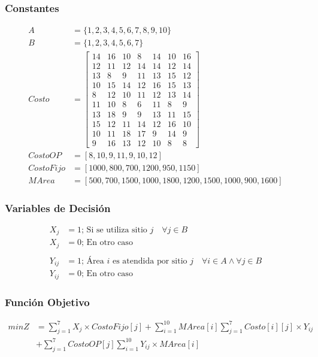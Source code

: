\documentclass[a4paper,12pt]{article}
\begin{document}
\subsubsection{Constantes}
\begin{equation*}
\begin{split}
	A&=\{1,2,3,4,5,6,7,8,9,10\}\\
	B&=\{1,2,3,4,5,6,7\}\\
	Costo &= \begin{bmatrix}
	14 & 16 & 10 & 8 & 14 & 10 & 16\\
	12 & 11 & 12 & 14 & 14 & 12 & 14\\
	13 & 8 & 9 & 11 & 13 & 15 & 12\\
	10 & 15 & 14 & 12 & 16 & 15 & 13\\
	8 & 12 & 10 & 11 & 12 & 13 & 14\\
	11 & 10 & 8 & 6 & 11 & 8 & 9\\
	13 & 18 & 9 & 9 & 13 & 11 & 15\\
	15 & 12 & 11 & 14 & 12 & 16 & 10\\
	10 & 11 & 18 & 17 & 9 & 14 & 9\\
	9 & 16 & 13 & 12 & 10 & 8 & 8
	\end{bmatrix}\\
	CostoOP&=[8,10,9,11,9,10,12]\\
	CostoFijo&=[1000,800,700,1200,950,1150]\\
	MArea&=[500,700,1500,1000,1800,1200,1500,1000,900,1600]
\end{split}
\end{equation*}
\subsubsection{Variables de Decisión}
\begin{equation*}
\begin{split}
	X_j&=1 \text{; Si se utiliza sitio }j\quad \forall j \in B\\
	X_j&=0 \text{; En otro caso}\\\\
	Y_{ij}&=1 \text{; Área } i \text{ es atendida por sitio }j\quad \forall i \in A \wedge \forall j \in B\\
	Y_{ij}&=0 \text{; En otro caso}
\end{split}
\end{equation*}
\subsubsection{Función Objetivo}
\begin{equation*}
\begin{split}
	minZ&=\sum_{j=1}^{7}X_j\times CostoFijo[j]+\sum_{i=1}^{10}MArea[i]\sum_{j=1}^{7}Costo[i][j]\times Y_{ij}\\
	&+\sum_{j=1}^{7}CostoOP[j]\sum_{i=1}^{10}Y_{ij}\times MArea[i] \quad 
\end{split}
\end{equation*}
\end{document}
